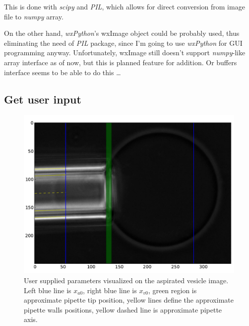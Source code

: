 This is done with \emph{scipy} and \emph{PIL}, which allows for direct conversion from image file to \emph{numpy} array.

On the other hand, \emph{wxPython}'s wxImage object could be probably used, thus eliminating the need of \emph{PIL} package, since I'm going to use \emph{wxPython} for GUI programming anyway. Unfortunately, wxImage still doesn't support \emph{numpy}-like array interface as of now, but this is planned feature for addition. Or buffers interface seems to be able to do this \ldots

\subsection{Get user input}\label{getinput}

\begin{figure}
	\includegraphics[width=\columnwidth]{figs/userinput.pdf}
	\caption{User supplied parameters visualized on the aspirated vesicle image. Left blue line is $x_{a0}$, right blue line is $x_{v0}$, green region is approximate pipette tip position, yellow lines define the approximate pipette walls positions, yellow dashed line is approximate pipette axis.}
	\label{fig:userinput}
\end{figure}

